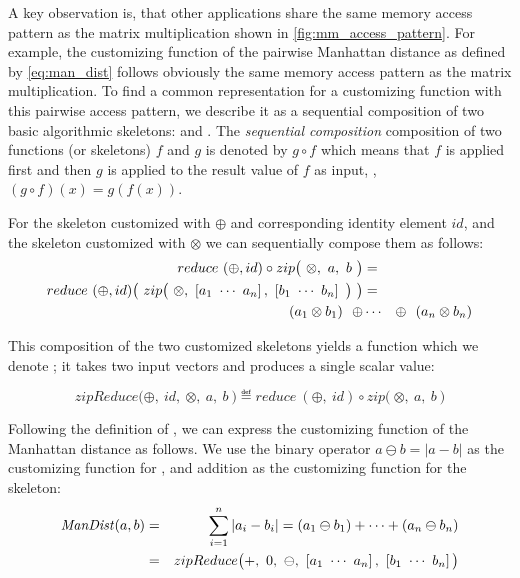 A key observation is, that other applications share the same memory access pattern as the matrix multiplication shown in \autoref{fig:mm_access_pattern}.
For example, the customizing function of the pairwise Manhattan distance as defined by \autoref{eq:man_dist} follows obviously the same memory access pattern as the matrix multiplication.
To find a common representation for a customizing function with this pairwise access pattern, we describe it as a sequential composition of two basic algorithmic skeletons: \zip and \reduce.
The \emph{sequential composition} composition of two functions (or skeletons) $f$ and $g$ is denoted by $g \circ f$ which means that $f$ is applied first and then $g$ is applied to the result value of $f$ as input, \ie, $(g\circ f)(x) = g(f(x))$.

For the \reduce skeleton customized with $\oplus$ and corresponding identity element $id$, and the \zip skeleton customized with $\otimes$ we can sequentially compose them as follows:
\begin{eqnarray*}
  reduce\ (\oplus, id) \circ zip\big(\ \otimes,\ a,\ b\ \big) &=&\\
  reduce\ (\oplus, id) \big(\ zip\big(\ \otimes,\ \DottedVector{a_1}{a_n},\ \DottedVector{b_1}{b_n}\ \big)\ \big) &=&\\
  (a_1 \otimes b_1)\ \ \oplus &\cdots& \oplus\ \ (a_n \otimes b_n)
\end{eqnarray*}

This composition of the two customized skeletons yields a function which we denote \zipReduce; it takes two input vectors and produces a single scalar value:

\begin{equation*}
  zipReduce\big(\oplus,\ id,\ \otimes,\ a,\ b\ \big) \eqdef 
  reduce\ (\oplus,\ id) \circ zip\big(\ \otimes,\ a,\ b\ \big)
\end{equation*}

Following the definition of \zipReduce, we can express the customizing function of the Manhattan distance as follows.
We use the binary operator $a \ominus b = |a - b|$ as the customizing function for \zip, and addition as the customizing function for the \reduce skeleton:
\begin{eqnarray*}
    \ManDist(a, b) &=& \sum_{i=1}^{n} | a_i - b_i | = (a_1 \ominus b_1) + \cdots + (a_n \ominus b_n)\\
    &=& zipReduce\big(+,\ 0,\ \ominus,\ \DottedVector{a_1}{a_n},\ \DottedVector{b_1}{b_n}\big)
\end{eqnarray*}

